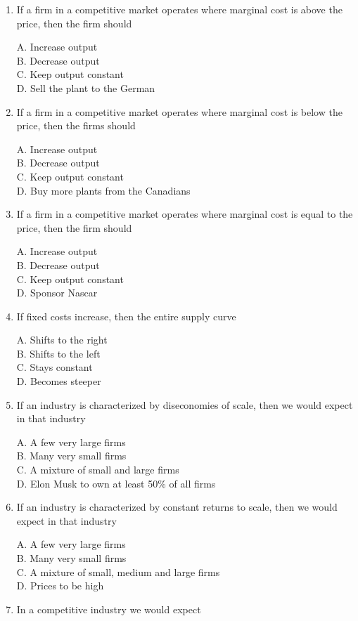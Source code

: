 \documentclass[
]{book}
\begin{document}
\begin{enumerate}
\def\labelenumi{\arabic{enumi}.}
\item
  If a firm in a competitive market operates where marginal cost is above the price, then the firm should

  A. Increase output\\
  B. Decrease output\\
  C. Keep output constant\\
  D. Sell the plant to the German
\item
  If a firm in a competitive market operates where marginal cost is below the price, then the firms should

  A. Increase output\\
  B. Decrease output\\
  C. Keep output constant\\
  D. Buy more plants from the Canadians
\item
  If a firm in a competitive market operates where marginal cost is equal to the price, then the firm should

  A. Increase output\\
  B. Decrease output\\
  C. Keep output constant\\
  D. Sponsor Nascar
\item
  If fixed costs increase, then the entire supply curve

  A. Shifts to the right\\
  B. Shifts to the left\\
  C. Stays constant\\
  D. Becomes steeper
\item
  If an industry is characterized by diseconomies of scale, then we would expect in that industry

  A. A few very large firms\\
  B. Many very small firms\\
  C. A mixture of small and large firms\\
  D. Elon Musk to own at least 50\% of all firms
\item
  If an industry is characterized by constant returns to scale, then we would expect in that industry

  A. A few very large firms\\
  B. Many very small firms\\
  C. A mixture of small, medium and large firms\\
  D. Prices to be high
\item
  In a competitive industry we would expect


\end{enumerate}
\end{document}
